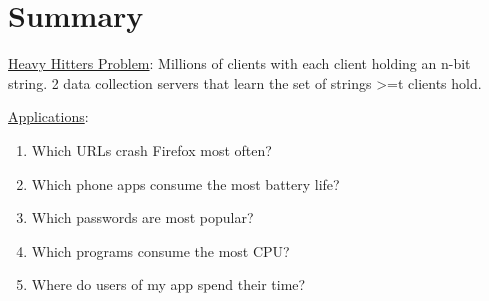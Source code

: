 
\clearpage
{}

%
\setcounter{section}{0} %

\section{Summary}
\underline{Heavy Hitters Problem}: Millions of clients with each client holding an n-bit string. 2 data collection servers that learn the set of strings >=t clients hold.

\underline{Applications}:
\begin{enumerate}
   \item Which URLs crash Firefox most often? 
   \item Which phone apps consume the most battery life?
   \item Which passwords are most popular?
   \item Which programs consume the most CPU?
   \item Where do users of my app spend their time?
\end{enumerate}

